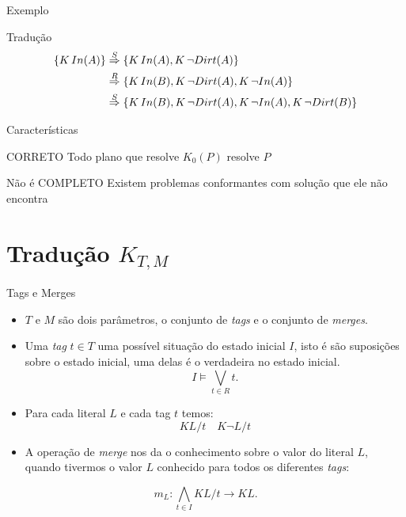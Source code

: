 \begin{frame}{Exemplo}
    \begin{block}{Tradução}
        \begin{align*}
            \{ K\, In(A)  \} & \overset{S}{\Rightarrow} \{ K\, In(A), K\,\lnot Dirt(A) \} \\
                            & \overset{R}{\Rightarrow} \{ K\, In(B), K\,\lnot Dirt(A), K\, \lnot In(A) \} \\
                            & \overset{S}{\Rightarrow} \{ K\, In(B), K\,\lnot Dirt(A), K\, \lnot In(A), K\,\lnot Dirt(B) \} 
        \end{align*}
\end{block}
    
    
\end{frame}

\begin{frame}{Características}
    \begin{block}{CORRETO}
        Todo plano que resolve $K_0(P)$ resolve $P$
    \end{block}
    \begin{block}{\alert{Não é COMPLETO}}
        Existem problemas conformantes com solução que ele não encontra
    \end{block}
    
    
\end{frame}

\section{Tradução $K_{T,M}$}

\begin{frame}{Tags e Merges}
     \begin{itemize}
    \item $T$ e $M$ são dois parâmetros, o conjunto de \textit{tags} e o conjunto de \textit{merges}. 
    \item Uma \textit{tag} $t \in T$ uma possível situação do estado inicial $I$, isto é
        são suposições sobre o estado inicial, uma delas é o verdadeira no estado inicial.
        \[
            I \models \bigvee_{t \in R} t.
        \]
    
    \item Para cada literal $L$ e cada tag $t$ temos:
    \[KL/t \quad K \lnot L/t\]
    
    \item A operação de \textit{merge} nos da o conhecimento sobre o valor do 
        literal $L$, quando tivermos o valor $L$ conhecido para todos os diferentes 
        \textit{tags}:
    \end{itemize}
        \[
            m_{L} : \bigwedge_{t \in I} KL/t \rightarrow KL.
        \]
\end{frame}

